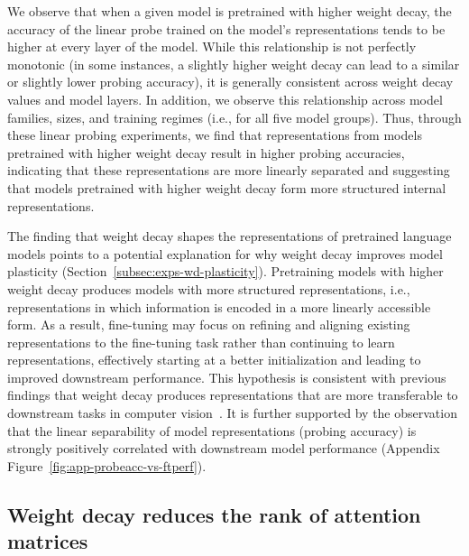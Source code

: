 We observe that when a given model is pretrained with higher weight decay, the accuracy of the linear probe trained on the model's representations tends to be higher at every layer of the model.
While this relationship is not perfectly monotonic (in some instances, a slightly higher weight decay can lead to a similar or slightly lower probing accuracy), it is generally consistent across weight decay values and model layers.
In addition, we observe this relationship  across model families, sizes, and training regimes (i.e., for all five model groups).
Thus, through these linear probing experiments, we find that representations from models pretrained with higher weight decay result in higher probing accuracies, indicating that these representations are more linearly separated and suggesting that models pretrained with higher weight decay form more structured internal representations.

The finding that weight decay shapes the representations of pretrained language models points to a potential explanation for why weight decay improves model plasticity (Section~\ref{subsec:exps-wd-plasticity}). Pretraining models with higher weight decay produces models with more structured representations, i.e., representations in which information is encoded in a more linearly accessible form. As a result, fine-tuning may focus on refining and aligning existing representations to the fine-tuning task rather than continuing to learn representations, effectively starting at a better initialization and leading to improved downstream performance. This hypothesis is consistent with previous findings that weight decay produces representations that are more transferable to downstream tasks in computer vision~\citep{lee2023rethinking}. It is further supported by the observation that the linear separability of model representations (probing accuracy) is strongly positively correlated with downstream model performance (Appendix Figure~\ref{fig:app-probeacc-vs-ftperf}).





\subsection{Weight decay reduces the rank of attention matrices}

